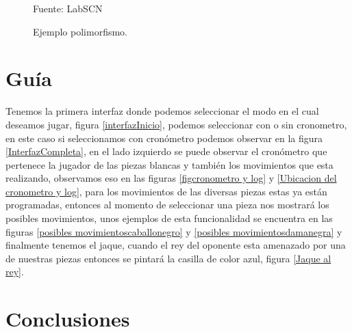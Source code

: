 \documentclass[conference]{IEEEtran}
\begin{document}
         \begin{figure}[ht]
            \caption{Ejemplo polimorfismo.}
           {{\footnotesize Fuente: LabSCN}}
            \label{figifigur}
        \end{figure}   
     
        
\section{Guía}
Tenemos la primera interfaz donde podemos seleccionar el modo en el cual deseamos jugar, figura \ref{interfazInicio}, podemos seleccionar con o sin cronometro, en este caso si seleccionamos con cronómetro podemos observar en la figura \ref{InterfazCompleta}, en el lado izquierdo se puede observar el cronómetro que pertenece la jugador de las piezas blancas y también los movimientos que esta realizando, observamos eso en las figuras \ref{figcronometro y log} y \ref{Ubicacion del cronometro y log}, para los movimientos de las diversas piezas estas ya están programadas, entonces al momento de seleccionar una pieza nos mostrará los posibles movimientos, unos ejemplos de esta funcionalidad se encuentra en las figuras \ref{posibles movimientoscaballonegro} y \ref{posibles movimientosdamanegra} y finalmente tenemos el jaque, cuando el rey del oponente esta amenazado por una de nuestras piezas entonces se pintará la casilla de color azul, figura \ref{Jaque al rey}.


\section{Conclusiones}
\end{document}
